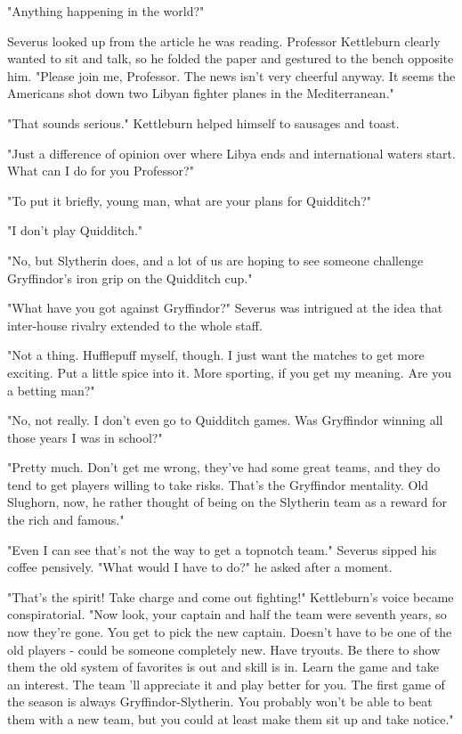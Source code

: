 \documentclass[a4paper,11pt]{article}
\begin{document}
"Anything happening in the world?"

Severus looked up from the article he was reading. Professor Kettleburn clearly wanted to sit and talk, so he folded the paper and gestured to the bench opposite him. "Please join me, Professor. The news isn't very cheerful anyway. It seems the Americans shot down two Libyan fighter planes in the Mediterranean."

"That sounds serious." Kettleburn helped himself to sausages and toast.

"Just a difference of opinion over where Libya ends and international waters start. What can I do for you Professor?"

"To put it briefly, young man, what are your plans for Quidditch?"

"I don't play Quidditch."

"No, but Slytherin does, and a lot of us are hoping to see someone challenge Gryffindor's iron grip on the Quidditch cup."

"What have you got against Gryffindor?" Severus was intrigued at the idea that inter-house rivalry extended to the whole staff.

"Not a thing. Hufflepuff myself, though. I just want the matches to get more exciting. Put a little spice into it. More sporting, if you get my meaning. Are you a betting man?"

"No, not really. I don't even go to Quidditch games. Was Gryffindor winning all those years I was in school?"

"Pretty much. Don't get me wrong, they've had some great teams, and they do tend to get players willing to take risks. That's the Gryffindor mentality. Old Slughorn, now, he rather thought of being on the Slytherin team as a reward for the rich and famous."

"Even I can see that's not the way to get a topnotch team." Severus sipped his coffee pensively. "What would I have to do?" he asked after a moment.

"That's the spirit! Take charge and come out fighting!" Kettleburn's voice became conspiratorial. "Now look, your captain and half the team were seventh years, so now they're gone. You get to pick the new captain. Doesn't have to be one of the old players - could be someone completely new. Have tryouts. Be there to show them the old system of favorites is out and skill is in. Learn the game and take an interest. The team 'll appreciate it and play better for you. The first game of the season is always Gryffindor-Slytherin. You probably won't be able to beat them with a new team, but you could at least make them sit up and take notice."
\end{document}

